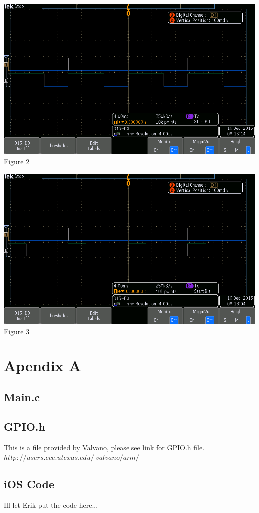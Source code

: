 \documentclass[12pt]{article}
\begin{document}
\begin {center}
\includegraphics[scale=.75]{half-power}
\\
Figure 2
\end {center}
\begin {center}
\includegraphics[scale=.75]{quarter-power}
\\
Figure 3
\end {center}


\newpage
\section{Apendix A}
\subsection{Main.c}


\subsection{GPIO.h}
This is a file provided by Valvano, please see link for GPIO.h file.\\
$http://users.ece.utexas.edu/~valvano/arm/$\\


\subsection{iOS Code}
Ill let Erik put the code here...
\end{document}

